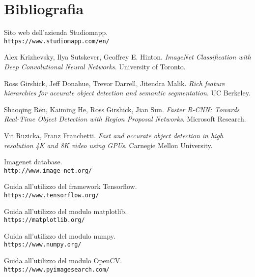 \section{Bibliografia}

\begin{thebibliography}{99}

Sito web dell'azienda Studiomapp.
\\\texttt{https://www.studiomapp.com/en/}
 
Alex Krizhevsky, Ilya Sutskever, Geoffrey E. Hinton.
\textit{ImageNet Classification with Deep Convolutional
Neural Networks}. University of Toronto. 
 
Ross Girshick, Jeff Donahue, Trevor Darrell, Jitendra Malik.
\textit{Rich feature hierarchies for accurate object detection and semantic segmentation}. UC Berkeley. 
 
Shaoqing Ren, Kaiming He, Ross Girshick, Jian Sun.
\textit{Faster R-CNN: Towards Real-Time Object Detection
with Region Proposal Networks}. Microsoft Research.
 
Vıt Ruzicka, Franz Franchetti.
\textit{Fast and accurate object detection in high resolution 4K and 8K video using GPUs}. Carnegie Mellon University.

Imagenet database.
\\\texttt{http://www.image-net.org/}

Guida all'utilizzo del framework Tensorflow.
\\\texttt{https://www.tensorflow.org/}

Guida all'utilizzo del modulo matplotlib.
\\\texttt{https://matplotlib.org/}

Guida all'utilizzo del modulo numpy.
\\\texttt{https://www.numpy.org/}

Guida all'utilizzo del modulo OpenCV.
\\\texttt{https://www.pyimagesearch.com/}

\end{thebibliography}